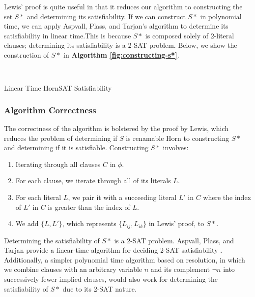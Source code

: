 \documentclass{article}
\begin{document}
\noindent Lewis' proof is quite useful in that it reduces our algorithm to constructing the set $S*$ and determining its satisfiability. If we can construct $S*$ in polynomial time, we can apply Aspvall, Plass, and Tarjan's algorithm \cite{aspvall_1979} to determine its satisfiability in linear time.This is because $S*$ is composed solely of 2-literal clauses; determining its satisfiability is a 2-SAT problem. Below, we show the construction of $S*$ in \textbf{Algorithm \ref{fig:constructing-s*}}.

\begin{algorithm}
  \begin{algorithmic}
      \\
             
          \EndFor
        \EndFor
      \EndFor
    \EndProcedure
  \end{algorithmic}
  \caption{Linear Time HornSAT Satisfiability}
  \label{fig:constructing-s*}
\end{algorithm}

\subsubsection{Algorithm Correctness}

\noindent The correctness of the algorithm is bolstered by the proof by Lewis, which reduces the problem of determining if $S$ is renamable Horn to constructing $S*$ and determining if it is satisfiable. Constructing $S*$ involves:

\begin{enumerate}
  \item Iterating through all clauses $C$ in $\phi$.
  \item For each clause, we iterate through all of its literals $L$.
  \item For each literal $L$, we pair it with a succeeding literal $L'$ in $C$ where the index of $L'$ in $C$ is greater than the index of $L$.
  \item We add $\{L, L'\}$, which represents $\{L_{ij}, L_{ik}\}$ in Lewis' proof, to $S*$.
\end{enumerate}

\noindent Determining the satisfiability of $S*$ is a 2-SAT problem. Aspvall, Plass, and Tarjan provide a linear-time algorithm for deciding 2-SAT satisfiability \cite{aspvall_1979}. Additionally, a simpler polynomial time algorithm based on resolution, in which we combine clauses with an arbitrary variable $n$ and its complement $\lnot n$ into successively fewer implied clauses, would also work for determining the satisfiability of $S*$ due to its 2-SAT nature.
\end{document}
